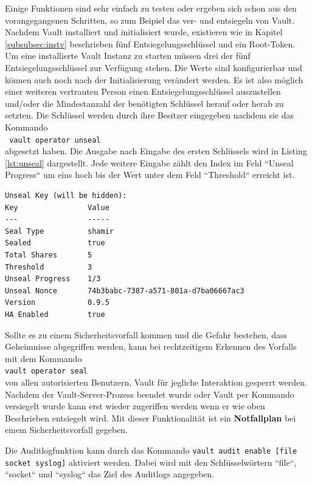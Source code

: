 \documentclass[
book,
a4paper,   
titlepage,  
halfparskip,
12pt        
]{scrartcl}
\newcommand\inline{\lstinline[basicstyle=\ttfamily]}
\begin{document}
\begin{onehalfspacing}
Einige Funktionen sind sehr einfach zu testen oder ergeben sich schon aus den vorangegangenen Schritten, so zum Beipiel das ver- und entsiegeln von Vault. Nachdem Vault installiert und initialisiert wurde, existieren wie in Kapitel \vref{subsubsec:instv} beschrieben fünf Entsiegelungsschlüssel und ein Root-Token. Um eine installierte Vault Instanz zu starten müssen drei der fünf Entsiegelungsschlüssel zur Verfügung stehen. Die Werte sind konfigurierbar und können auch noch nach der Initialisierung verändert werden. Es ist also möglich einer weiteren vertrauten Person einen Entsiegelungsschlüssel auszustellen und/oder die Mindestanzahl der benötigten Schlüssel herauf oder herab zu setzten. Die Schlüssel werden durch ihre Besitzer eingegeben nachdem sie das Kommando\\\inline| vault operator unseal|\\abgesetzt haben. Die Ausgabe nach Eingabe des ersten Schlüssels wird in Listing \vref{lst:unseal} dargestellt. Jede weitere Eingabe zählt den Index im Feld ``Unseal Progress`` um eins hoch bis der Wert unter dem Feld ``Threshold`` erreicht ist. 
\begin{lstlisting}[caption={[Entsiegelungsprozess] Erster Schritt im Entsiegelungsprozess von Vault}, label=lst:unseal, captionpos=b, basicstyle=\ttfamily] 
Unseal Key (will be hidden): 
Key                Value
---                -----
Seal Type          shamir
Sealed             true
Total Shares       5
Threshold          3
Unseal Progress    1/3
Unseal Nonce       74b3babc-7387-a571-801a-d7ba06667ac3
Version            0.9.5
HA Enabled         true
\end{lstlisting}
Sollte es zu einem Sicherheitsvorfall kommen und die Gefahr bestehen, dass Geheimnisse abgegriffen werden, kann bei rechtzeitigem Erkennen des Vorfalls mit dem Kommando\\\inline|vault operator seal|\\von allen autorisierten Benutzern, Vault für jegliche Interaktion gesperrt werden. Nachdem der Vault-Server-Prozess beendet wurde oder Vault per Kommando versiegelt wurde kann erst wieder zugeriffen werden wenn er wie oben Beschrieben entsiegelt wird. Mit dieser Funktionalität ist ein \textbf{Notfallplan} bei einem Sicherheitsvorfall gegeben.

Die Auditlogfunktion kann durch das Kommando \inline|vault audit enable [file socket syslog]| aktiviert werden. Dabei wird mit den Schlüsselwörtern ``file``, ``socket`` und ``syslog`` das Ziel des Auditlogs angegeben.


\end{onehalfspacing}
\end{document}
